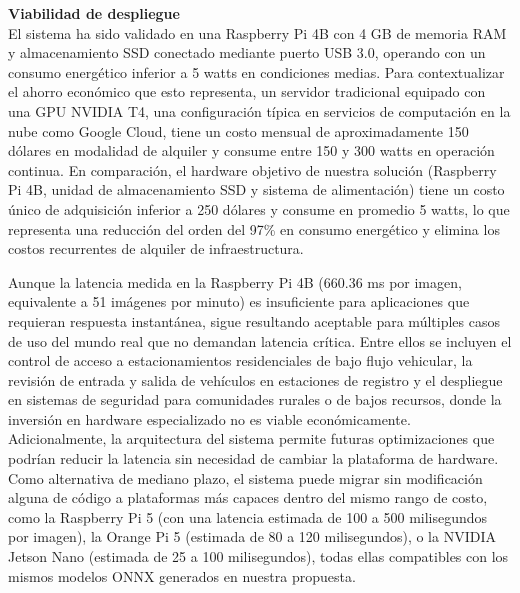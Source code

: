 {\sffamily{}\color{MASA-Blue} \textbf{Viabilidad de despliegue}}\\
El sistema ha sido validado en una Raspberry Pi 4B con 4 GB de memoria RAM y almacenamiento SSD conectado mediante puerto USB 3.0, operando con un consumo energético inferior a 5 watts en condiciones medias. Para contextualizar el ahorro económico que esto representa, un servidor tradicional equipado con una GPU NVIDIA T4, una configuración típica en servicios de computación en la nube como Google Cloud, tiene un costo mensual de aproximadamente 150 dólares en modalidad de alquiler y consume entre 150 y 300 watts en operación continua. En comparación, el hardware objetivo de nuestra solución (Raspberry Pi 4B, unidad de almacenamiento SSD y sistema de alimentación) tiene un costo único de adquisición inferior a 250 dólares y consume en promedio 5 watts, lo que representa una reducción del orden del 97\% en consumo energético y elimina los costos recurrentes de alquiler de infraestructura.

Aunque la latencia medida en la Raspberry Pi 4B (660.36 ms por imagen, equivalente a 51 imágenes por minuto) es insuficiente para aplicaciones que requieran respuesta instantánea, sigue resultando aceptable para múltiples casos de uso del mundo real que no demandan latencia crítica. Entre ellos se incluyen el control de acceso a estacionamientos residenciales de bajo flujo vehicular, la revisión de entrada y salida de vehículos en estaciones de registro y el despliegue en sistemas de seguridad para comunidades rurales o de bajos recursos, donde la inversión en hardware especializado no es viable económicamente. Adicionalmente, la arquitectura del sistema permite futuras optimizaciones que podrían reducir la latencia sin necesidad de cambiar la plataforma de hardware. Como alternativa de mediano plazo, el sistema puede migrar sin modificación alguna de código a plataformas más capaces dentro del mismo rango de costo, como la Raspberry Pi 5 (con una latencia estimada de 100 a 500 milisegundos por imagen), la Orange Pi 5 (estimada de 80 a 120 milisegundos), o la NVIDIA Jetson Nano (estimada de 25 a 100 milisegundos), todas ellas compatibles con los mismos modelos ONNX generados en nuestra propuesta.


